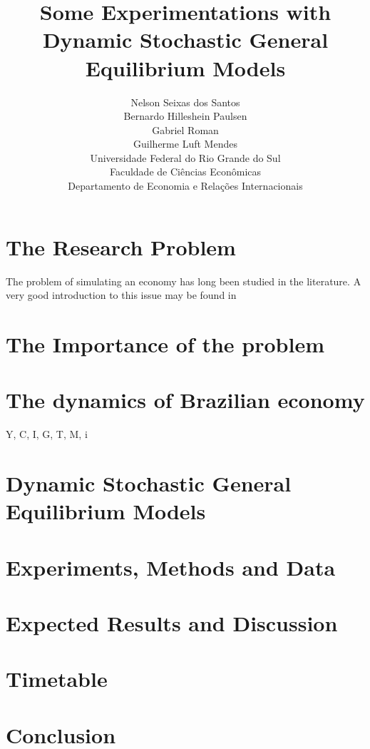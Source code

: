 \documentclass[a4paper]{article}
\title{Some Experimentations with Dynamic Stochastic General Equilibrium Models}
\author{Nelson Seixas dos Santos \\ Bernardo Hilleshein Paulsen \\ Gabriel Roman \\ Guilherme Luft Mendes \\ Universidade Federal do Rio Grande do Sul\\ Faculdade de Ciências Econômicas \\ Departamento de Economia e Relações Internacionais}
\begin{document}
	\maketitle
	
	
	
	\section{The Research Problem}
	
	The problem of simulating an economy has long been studied in the literature.  A very good introduction to this issue may be found in \citet{mccandless2008} 
	
	\section{The Importance of the problem}
	
	\section{The dynamics of Brazilian economy}
	Y, C, I, G, T, M, i
	
	\section{Dynamic Stochastic General Equilibrium Models}
	
	
	
	\section{Experiments, Methods and Data}
	
	
	
	\section{Expected Results and Discussion}
	
	
	\section{Timetable}
	
	
	\section{Conclusion}
	
	
	
\end{document}
